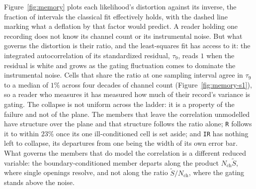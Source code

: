 Figure~\ref{fig:memory} plots each likelihood's distortion against its inverse, the fraction of intervals the classical fit effectively holds, with the dashed line marking what a deflation by that factor would predict.
A reader holding one recording does not know its channel count or its instrumental noise. But
what governs the distortion is their ratio, and the least-squares fit has
access to it: the integrated autocorrelation of its standardized residual, $\tau_{9}$, reads $1$
when the residual is white and grows as the gating fluctuation comes to dominate the instrumental
noise. Cells that share the ratio at one sampling interval agree in $\tau_{9}$ to a median of
$1\%$ across four decades of channel count (Figure~\ref{fig:memory-s1}), so a
reader who measures it has measured how much of their record's variance is gating.
The collapse is not uniform across the ladder: it is a property of the failure and not of the plane. The members that leave the correlation unmodelled have structure over the plane and that structure
follows the ratio alone; \texttt{R} follows it to within $23\%$ once its one ill-conditioned cell
is set aside; and \texttt{IR} has nothing left to collapse, its departures from one being the
width of its own error bar. What governs the members that do model the correlation is a different
reduced variable: the boundary-conditioned member departs along the product
$N_{\mathrm{ch}}\widetilde{S}$, where single openings resolve, and not
along the ratio $\widetilde{S}/N_{\mathrm{ch}}$, where the gating stands above the noise.

